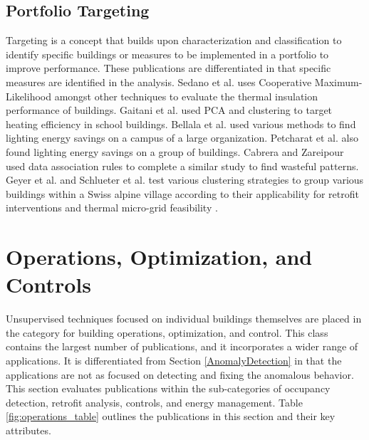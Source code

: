 \subsection{Portfolio Targeting}
Targeting is a concept that builds upon characterization and classification to identify specific buildings or measures to be implemented in a portfolio to improve performance. These publications are differentiated in that specific measures are identified in the analysis. Sedano et al. \cite{sedano_improving_2009} uses Cooperative Maximum-Likelihood amongst other techniques to evaluate the thermal insulation performance of buildings. Gaitani et al. \cite{gaitani_using_2010} used PCA and clustering to target heating efficiency in school buildings. Bellala et al. \cite{bellala_towards_2011} used various methods to find lighting energy savings on a campus of a large organization. Petcharat et al. \cite{petcharat_assessment_2012} also found lighting energy savings on a group of buildings. Cabrera and Zareipour \cite{cabrera_data_2013} used data association rules to complete a similar study to find wasteful patterns. Geyer et al.  and Schlueter et al. test various clustering strategies to group various buildings within a Swiss alpine village according to their applicability for retrofit interventions \cite{geyer_application_2016} and thermal micro-grid feasibility \cite{schlueter_analysis_2016}.

\section{Operations, Optimization, and Controls}
\label{Operations}
Unsupervised techniques focused on individual buildings themselves are placed in the category for building operations, optimization, and control. This class contains the largest number of publications, and it incorporates a wider range of applications. It is differentiated from Section \ref{AnomalyDetection} in that the applications are not as focused on detecting and fixing the anomalous behavior. This section evaluates publications within the sub-categories of occupancy detection, retrofit analysis, controls, and energy management. Table \ref{fig:operations_table} outlines the publications in this section and their key attributes.


